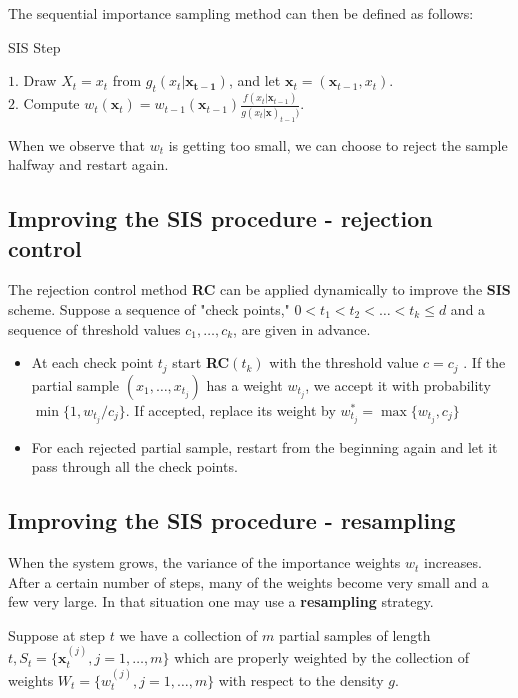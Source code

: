 \documentclass[times, utf8, diplomski]{fer}
\begin{document}
The sequential importance sampling method can then be defined as follows:

\vspace{5mm}
\begin{algorithm}[H]
\caption{SIS Step}
$1.$ Draw $X_t=x_t$ from $g_t(x_t | \mathbf{x_{t-1}})$, and let $\mathbf{x}_t = (\mathbf{x}_{t - 1}, x_t)$.\\
$2.$ Compute $w_t(\mathbf{x}_t) = w_{t - 1}(\mathbf{x}_{t - 1})\frac{f(x_t | \mathbf{x}_{t - 1})}{g(x_t | \mathbf{x})_{t - 1})}$.\\
\label{SIS_step}
\end{algorithm}
\vspace{5mm}
When we observe that $w_t$ is getting too small, we can choose to reject the sample halfway and restart again.

\subsection{Improving the SIS procedure - rejection control}
\label{SIS_RC}
The rejection control method \textbf{RC} can be applied dynamically to improve the  \textbf{SIS} scheme. Suppose a sequence of "check points," $0 < t_1 < t_2 < \ldots < t_k \leq d$ and a sequence of threshold values $c_1, \ldots, c_k$, are given in advance. 
\begin{itemize}
\item{At each check point $t_j$ start \textbf{RC}$(t_k)$ with the threshold value $c = c_j$ . If the partial sample $(x_1, \ldots, x_{t_j})$ has a weight $w_{t_j}$, we accept it with probability $\min \{ 1, w_{t_j}/c_j \}$. If accepted, replace its weight by $w^{*}_{t_j} = \max \{ w_{t_j}, c_j \}$}
\item{For each rejected partial sample, restart from the beginning again and let it pass through all the check points.}
\end{itemize}

\subsection{Improving the SIS procedure - resampling}
When the system grows, the variance of the importance weights $w_t$ increases. After a certain number of steps, many of the weights become very small and a few very large. In that situation one may use a \textbf{resampling} strategy. 

Suppose at step $t$ we have a collection of $m$ partial samples of length $t, S_t = \{ \mathbf{x}_{t}^{(j)}, j = 1, \ldots, m \}$ which are properly weighted by the collection of weights $W_t = \{w_t^{(j)}, j = 1, \ldots, m\}$ with respect to the density $g$.
\end{document}
